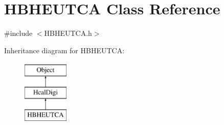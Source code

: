 \hypertarget{class_h_b_h_e_u_t_c_a}{}\section{H\+B\+H\+E\+U\+T\+C\+A Class Reference}
\label{class_h_b_h_e_u_t_c_a}


{\ttfamily \#include $<$H\+B\+H\+E\+U\+T\+C\+A.\+h$>$}

Inheritance diagram for H\+B\+H\+E\+U\+T\+C\+A\+:\begin{figure}[H]
\begin{center}
\leavevmode
\includegraphics[height=3.000000cm]{class_h_b_h_e_u_t_c_a}
\end{center}
\end{figure}
